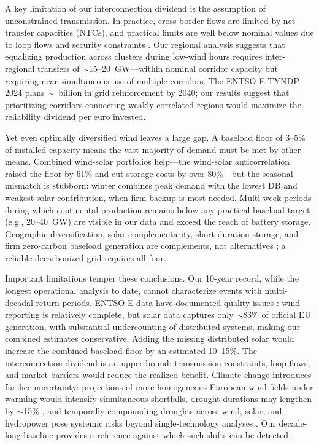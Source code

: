 \documentclass{article}
\begin{document}
A key limitation of our interconnection dividend is the assumption of unconstrained transmission. In practice, cross-border flows are limited by net transfer capacities (NTCs), and practical limits are well below nominal values due to loop flows and security constraints \citep{entsoe2024tyndp}. Our regional analysis suggests that equalizing production across clusters during low-wind hours requires inter-regional transfers of $\sim$15--20~GW---within nominal corridor capacity but requiring near-simultaneous use of multiple corridors. The ENTSO-E TYNDP 2024 plans $\sim$~billion in grid reinforcement by 2040; our results suggest that prioritizing corridors connecting weakly correlated regions would maximize the reliability dividend per euro invested.

Yet even optimally diversified wind leaves a large gap. A baseload floor of 3--5\% of installed capacity means the vast majority of demand must be met by other means. Combined wind-solar portfolios help---the wind-solar anticorrelation raised the floor by 61\% and cut storage costs by over 80\%---but the seasonal mismatch is stubborn: winter combines peak demand with the lowest DB and weakest solar contribution, when firm backup is most needed. Multi-week periods during which continental production remains below any practical baseload target (e.g., 20--40~GW) are visible in our data and exceed the reach of battery storage. Geographic diversification, solar complementarity, short-duration storage, and firm zero-carbon baseload generation are complements, not alternatives \citep{brown2018}; a reliable decarbonized grid requires all four.

Important limitations temper these conclusions. Our 10-year record, while the longest operational analysis to date, cannot characterize events with multi-decadal return periods. ENTSO-E data have documented quality issues \citep{hirth2018}: wind reporting is relatively complete, but solar data captures only $\sim$83\% of official EU generation, with substantial undercounting of distributed systems, making our combined estimates conservative. Adding the missing distributed solar would increase the combined baseload floor by an estimated 10--15\%. The interconnection dividend is an upper bound: transmission constraints, loop flows, and market barriers would reduce the realized benefit. Climate change introduces further uncertainty: projections of more homogeneous European wind fields under warming \citep{wohland_more_2017,tobin2015} would intensify simultaneous shortfalls, drought durations may lengthen by $\sim$15\% \citep{qu2025}, and temporally compounding droughts across wind, solar, and hydropower pose systemic risks beyond single-technology analyses \citep{vandermost2024}. Our decade-long baseline provides a reference against which such shifts can be detected.
\end{document}
